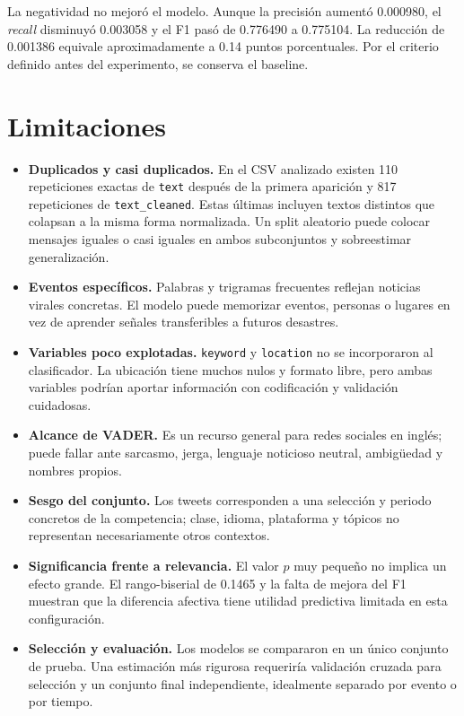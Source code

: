 \documentclass[11pt,letterpaper]{article}
\newcommand{\code}[1]{\texttt{#1}}
\begin{document}
La negatividad no mejoró el modelo. Aunque la precisión aumentó 0.000980, el \emph{recall} disminuyó 0.003058 y el F1 pasó de 0.776490 a 0.775104. La reducción de 0.001386 equivale aproximadamente a 0.14 puntos porcentuales. Por el criterio definido antes del experimento, se conserva el baseline.

\section{Limitaciones}

\begin{itemize}
  \item \textbf{Duplicados y casi duplicados.} En el CSV analizado existen 110 repeticiones exactas de \code{text} después de la primera aparición y 817 repeticiones de \code{text\_cleaned}. Estas últimas incluyen textos distintos que colapsan a la misma forma normalizada. Un split aleatorio puede colocar mensajes iguales o casi iguales en ambos subconjuntos y sobreestimar generalización.
  \item \textbf{Eventos específicos.} Palabras y trigramas frecuentes reflejan noticias virales concretas. El modelo puede memorizar eventos, personas o lugares en vez de aprender señales transferibles a futuros desastres.
  \item \textbf{Variables poco explotadas.} \code{keyword} y \code{location} no se incorporaron al clasificador. La ubicación tiene muchos nulos y formato libre, pero ambas variables podrían aportar información con codificación y validación cuidadosas.
  \item \textbf{Alcance de VADER.} Es un recurso general para redes sociales en inglés; puede fallar ante sarcasmo, jerga, lenguaje noticioso neutral, ambigüedad y nombres propios.
  \item \textbf{Sesgo del conjunto.} Los tweets corresponden a una selección y periodo concretos de la competencia; clase, idioma, plataforma y tópicos no representan necesariamente otros contextos.
  \item \textbf{Significancia frente a relevancia.} El valor $p$ muy pequeño no implica un efecto grande. El rango-biserial de 0.1465 y la falta de mejora del F1 muestran que la diferencia afectiva tiene utilidad predictiva limitada en esta configuración.
  \item \textbf{Selección y evaluación.} Los modelos se compararon en un único conjunto de prueba. Una estimación más rigurosa requeriría validación cruzada para selección y un conjunto final independiente, idealmente separado por evento o por tiempo.
\end{itemize}
\end{document}
